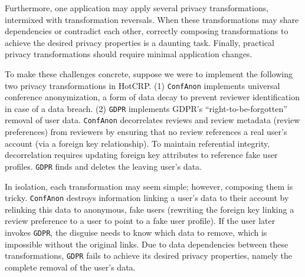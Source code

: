 Furthermore, one application may apply several privacy transformations, intermixed with
transformation reversals.  When these transformations may share dependencies or contradict each
other, correctly composing transformations to achieve the desired privacy properties is a daunting
task.
%
Finally, practical privacy transformations should require minimal application changes.
%

%
To make these challenges concrete, suppose we were to implement the following two privacy
transformations in HotCRP.
%
(1) \texttt{ConfAnon} implements universal conference anonymization, a form of data decay to
prevent reviewer identification in case of a data breach.
%
(2) \texttt{GDPR} implements GDPR's ``right-to-be-forgotten'' removal of user data.
%
\texttt{ConfAnon} decorrelates reviews and review metadata (\eg review preferences) from reviewers
by ensuring that no review references a real user's account (via a foreign key relationship).
To maintain referential integrity, decorrelation requires updating foreign key
attributes to reference fake user profiles.
\texttt{GDPR} finds and deletes the leaving user's data.
%

%
In isolation, each transformation may seem simple; however, composing them is tricky.
\texttt{ConfAnon} destroys information linking a user's data to their account by relinking this data
to anonymous, fake users (\eg rewriting the foreign key linking a review preference to a user to
point to a fake user profile).  If the user later invokes \texttt{GDPR}, the
disguise needs to know which data to remove, which is impossible without the original links.
%
Due to data dependencies between these transformations, \texttt{GDPR} fails to achieve its desired
privacy properties, namely the complete removal of the user's data.
%
